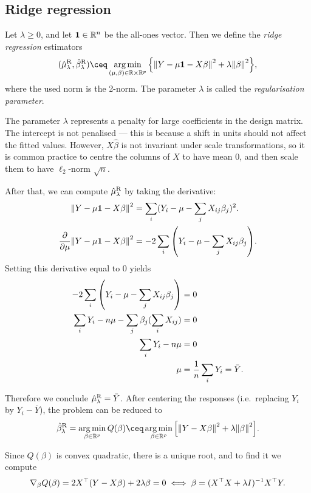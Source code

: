 \subsection{Ridge regression}
\begin{definition}
    Let $\lambda \geq 0$, and let $\mathbf 1 \in \mathbb R^n$ be the all-ones vector. Then we define the \emph{ridge regression} estimators
    \[
    (\hat\mu_\lambda^\Rm{R}, \hat\beta_\lambda^\Rm{R}) \ceq \argmin_{(\mu, \beta) \in \RR \times \RR^p} \qty{ \norm{Y - \mu\Bf 1 - X\beta}^2 + \lambda \norm{\beta}^2}, 
    \]
    where the used norm is the 2-norm. The parameter $\lambda$ is called the \emph{regularisation parameter}. 
\end{definition}

The parameter $\lambda$ represents a penalty for large coefficients in the design matrix. The intercept is not penalised --- this is because a shift in units should not affect the fitted values. However, $X\hat\beta$ is not invariant under scale transformations, so it is common practice to centre the columns of $X$ to have mean 0, and then scale them to have $\ell_2$-norm $\sqrt n$. 

After that, we can compute $\hat\mu_\lambda^\mathrm{R}$ by taking the derivative:  
\begin{align*}
    \norm{Y - \mu\mathbf{1} - X\beta}^2 &=  \sum_i (Y_i - \mu - \sum_j X_{ij}\beta_j)^2. \\
    \pdv{\mu} \norm{Y- \mu\mathbf{1} - X\beta}^2 &= -2 \sum_i \qty( Y_i - \mu - \sum_j X_{ij}\beta_j).
\end{align*}
Setting this derivative equal to 0 yields
\begin{align*}
    -2\sum_i \qty(Y_i - \mu - \sum_j X_{ij}\beta_j) &= 0 \\
    \sum_i Y_i - n\mu - \sum_j \beta_j (\sum_i X_{ij}) &= 0 \\
    \sum_i Y_i - n\mu &= 0 \\
    \mu &= \frac1n \sum_i Y_i = \bar Y. 
\end{align*}

Therefore we conclude $\hat\mu_\lambda^{\mathrm R} = \bar Y$. 
After centering the responses (i.e.\, replacing $Y_i$ by $Y_i - \bar Y$), the problem can be reduced to 
\[
\hat\beta_\lambda^{\Rm R} = \argmin_{\beta \in \RR^p} Q(\beta) \ceq \argmin_{\beta \in \RR^p}  \qty[ \norm{Y- X\beta}^2 + \lambda \norm{\beta}^2]. 
\]

Since $Q(\beta)$ is convex quadratic, there is a unique root, and to find it we compute
\[
\nabla_\beta Q(\beta) = 2 X^\top (Y - X \beta) + 2\lambda\beta = 0 \iff \beta = (X^\top X + \lambda I)^{-1} X^\top Y. 
\]

